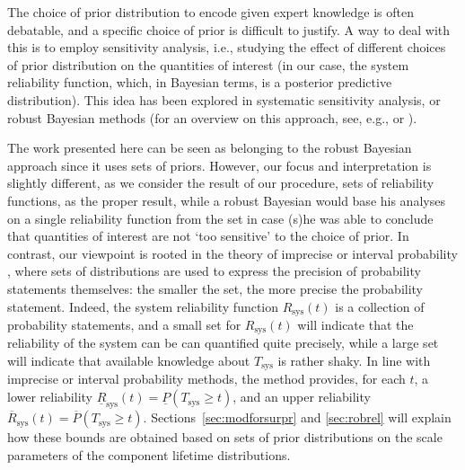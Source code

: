 \documentclass[Journal,letterpaper]{ascelike-new}
\newcommand{\ul}[1]{\underline{#1}}
\newcommand{\ol}[1]{\overline{#1}}
\newcommand{\Rsys}{R_\text{sys}}
\newcommand{\lRsys}{\ul{R}_\text{sys}}
\newcommand{\uRsys}{\ol{R}_\text{sys}}
\def\Rsys{R_\text{sys}}
\def\Tsys{T_\text{sys}}
\begin{document}
The choice of prior distribution to encode given expert knowledge is often debatable,
and a specific choice of prior is difficult to justify.
A way to deal with this is to employ sensitivity analysis,
i.e., studying the effect of different choices of prior distribution on the quantities of interest
(in our case, the system reliability function, which, in Bayesian terms, is a posterior predictive distribution).
This idea has been explored in systematic sensitivity analysis, or robust Bayesian methods
(for an overview on this approach, see, e.g.,
 or ). 

The work presented here can be seen as belonging to the robust Bayesian approach
since it uses sets of priors. However, our focus and interpretation is slightly different,
as we consider the result of our procedure, sets of reliability functions, as the proper result,
while a robust Bayesian would base his analyses on a single reliability function from the set
in case (s)he was able to conclude that quantities of interest are not `too sensitive' to the choice of prior.
In contrast, our viewpoint is rooted in the theory of imprecise or interval probability \cite{1991:walley,itip},
where sets of distributions are used to express the precision of probability statements themselves:
the smaller the set, the more precise the probability statement.
Indeed, the system reliability function $\Rsys(t)$ is a collection of probability statements,
and a small set for $\Rsys(t)$ will indicate that the reliability of the system can be can quantified quite precisely,
while a large set will indicate that available knowledge about $\Tsys$ is rather shaky.
%
In line with imprecise or interval probability methods, the method provides, for each $t$,
a lower reliability $\lRsys(t) = \ul{P}(T_\text{sys} \geq t)$,
and an upper reliability $\uRsys(t) = \ol{P}(T_\text{sys} \geq t)$.
Sections~\ref{sec:modforsurpr} and \ref{sec:robrel} will explain how these bounds are obtained
based on sets of prior distributions on the scale parameters of the component lifetime distributions.
\end{document}
